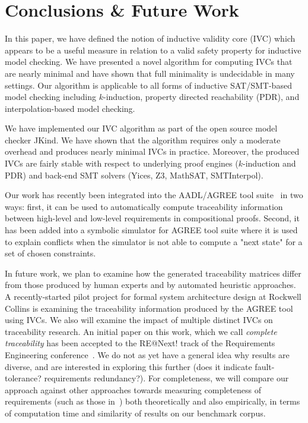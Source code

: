 \section{Conclusions \& Future Work}
\label{sec:conc}

In this paper, we have defined the notion of inductive validity core (IVC) which
appears to be a useful measure in relation to a valid safety property
for inductive model checking. We have presented a novel algorithm for
computing IVCs that are nearly minimal and have shown that full
minimality is undecidable in many settings. Our algorithm is
applicable to all forms of inductive SAT/SMT-based model checking
including $k$-induction, property directed reachability (PDR), and
interpolation-based model checking.

We have implemented our IVC algorithm as part of the open source model
checker JKind. We have shown that the algorithm requires only a
moderate overhead and produces nearly minimal IVCs in practice.
Moreover, the produced IVCs are fairly stable with respect to
underlying proof engines ($k$-induction and PDR) and back-end SMT
solvers (Yices, Z3, MathSAT, SMTInterpol).

Our work has recently been integrated into the AADL/AGREE tool suite~\cite{QFCS15:backes,hilt2013} in two ways: first, it can be used to automatically compute traceability information between high-level and low-level requirements in compositional proofs.  Second, it has been added into a symbolic simulator for AGREE tool suite where it is used to explain conflicts when the simulator is not able to compute a "next state" for a set of chosen constraints.

In future work, we plan to examine how the generated traceability matrices differ from those produced by human experts and by automated heuristic approaches.  A recently-started pilot project for formal system architecture design at Rockwell Collins is examining the traceability information produced by the AGREE tool using IVCs.  We also will examine the impact of multiple distinct IVCs on traceability research.  An initial paper on this work, which we call {\em complete traceability} has been accepted to the RE@Next! track of the Requirements Engineering conference~\cite{Murugesan16:renext}.  We do not as yet have a general idea why results are diverse, and are interested in exploring this further (does it indicate fault-tolerance? requirements redundancy?).  For completeness, we will compare our approach against other approaches towards measuring completeness of requirements (such as those in~\cite{chockler_coverage_2003, Kupferman:2006:SCF, kupferman_theory_2008}) both theoretically and also empirically, in terms of computation time and similarity of results on our benchmark corpus.

